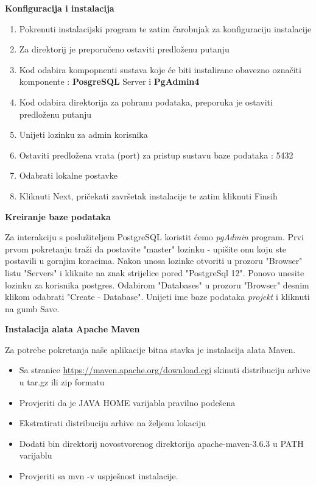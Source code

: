 		        \textbf{Konfiguracija i instalacija}
		        \begin{enumerate}
		            \item Pokrenuti instalacijski program te zatim čarobnjak za konfiguraciju instalacije
		            \item Za direktorij je preporučeno ostaviti predloženu putanju
		            \item Kod odabira kompopnenti sustava koje će biti instalirane obavezno označiti komponente : \textbf{PosgreSQL} Server i \textbf{PgAdmin4}
		            \item Kod odabira direktorija za pohranu podataka, preporuka je ostaviti predloženu putanju
		            \item Unijeti lozinku za admin korisnika
		            \item Ostaviti predložena vrata (port) za pristup sustavu baze podataka : 5432
		            \item Odabrati lokalne postavke
		            \item Kliknuti Next, pričekati završetak instalacije te zatim kliknuti Finsih
		        \end{enumerate}
		        
		        \textbf{Kreiranje baze podataka}
		        
		        Za interakciju s poslužiteljem PostgreSQL koristit ćemo \textit{pgAdmin} program. Prvi prvom pokretanju traži da postavite "master" lozinku - upišite onu koju ste postavili u gornjim koracima. Nakon unosa lozinke otvoriti u prozoru "Browser" listu "Servers" i kliknite na znak strijelice pored "PostgreSql 12". Ponovo unesite lozinku za korisnika postgres. 
		        Odabirom "Databases" u prozoru "Browser" desnim klikom odabrati "Create - Database". Unijeti ime baze podataka \textit{projekt} i kliknuti na gumb Save.
		        \newline 
		        
		\noindent \textbf{Instalacija alata Apache Maven}
		
		Za potrebe pokretanja naše aplikacije bitna stavka je instalacija alata Maven. 
		
		\begin{itemize}
		    \item Sa stranice \url{https://maven.apache.org/download.cgi} skinuti distribuciju arhive u tar.gz ili zip formatu
		    \item Provjeriti da je JAVA HOME varijabla pravilno podešena
		    \item Ekstratirati distribuciju arhive na željenu lokaciju
		    \item Dodati bin direktorij novostvorenog direktorija apache-maven-3.6.3 u PATH varijablu
		    \item Provjeriti sa mvn -v uspješnost instalacije.  
		\end{itemize}
			
